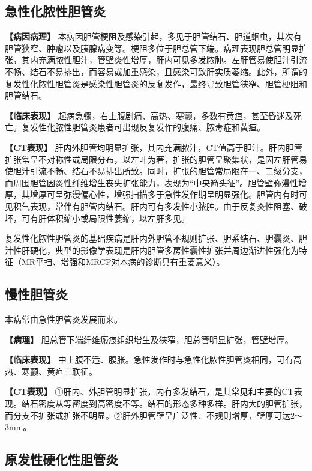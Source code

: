 \subsection{急性化脓性胆管炎}

\textbf{【病因病理】}
本病因胆管梗阻及感染引起，多见于胆管结石、胆道蛔虫，其次有胆管狭窄、肿瘤以及胰腺病变等。梗阻多位于胆总管下端。病理表现胆总管明显扩张，其内充满脓性胆汁，管壁炎性增厚，肝内可见多发脓肿。左肝管易使胆汁引流不畅、结石不易排出，而容易或加重感染，且感染可致肝实质萎缩。此外，所谓的复发性化脓性胆管炎是感染性胆管炎的反复发作，最终导致胆管狭窄、胆管梗阻和胆管结石。

\textbf{【临床表现】}
起病急骤，右上腹剧痛、高热、寒颤，多数有黄疸，甚至昏迷及死亡。复发性化脓性胆管炎患者可出现反复发作的腹痛、脓毒症和黄疸。

\textbf{【CT表现】}
肝内外胆管均明显扩张，其内充满脓汁，CT值高于胆汁。肝内胆管扩张常呈不对称性或局限分布，以左叶为著，扩张的胆管呈聚集状，是因左肝管易使胆汁引流不畅、结石不易排出所致。同时，扩张的胆管常局限在一、二级分支，而周围胆管因炎性纤维增生丧失扩张能力，表现为“中央箭头征”。胆管壁弥漫性增厚，其增厚可呈弥漫偏心性，增强扫描多于急性发作期呈明显强化。胆管内有时可见积气表现，常伴有胆管内结石。肝内可有多发性小脓肿。由于反复炎性阻塞、破坏，可有肝体积缩小或局限性萎缩，以左肝多见。

复发性化脓性胆管炎的基础疾病是肝内外胆管不规则扩张、胆系结石、胆囊炎、胆汁性肝硬化，典型的影像学表现是肝内胆管多房性囊性扩张并周边渐进性强化为特征（MR平扫、增强和MRCP对本病的诊断具有重要意义）。

\subsection{慢性胆管炎}

本病常由急性胆管炎发展而来。

\textbf{【病理】}
胆总管下端纤维瘢痕组织增生及狭窄，胆总管明显扩张，管壁增厚。

\textbf{【临床表现】}
中上腹不适、腹胀。急性发作时与急性化脓性胆管炎相同，可有高热、寒颤、黄疸三联征。

\textbf{【CT表现】}
①肝内、外胆管明显扩张，内有多发结石，是其常见和主要的CT表现。结石密度从等密度到高密度不等。结石的形态多种多样。肝内大的胆管扩张，而分支不扩张或扩张不明显。②肝外胆管壁呈广泛性、不规则增厚，壁厚可达2～3mm。

\subsection{原发性硬化性胆管炎}

